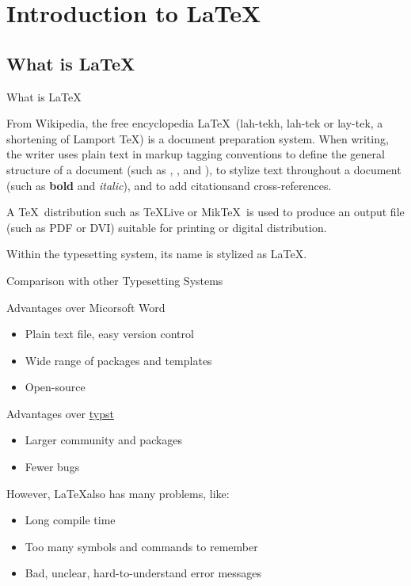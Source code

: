 \section{Introduction to \LaTeX}

\subsection{What is \LaTeX}

\begin{frame}{What is \LaTeX}
    \begin{block}{From Wikipedia, the free encyclopedia\footnotemark[1]}
        \LaTeX\ (lah-tekh, lah-tek or lay-tek, a shortening of Lamport \TeX) is a document preparation system. When writing, the writer uses plain text in markup tagging conventions to define the general structure of a document (such as , , and ), to stylize text throughout a document (such as \textbf{bold} and \textit{italic}), and to add citations\footnotemark[1] and cross-references. \medskip

        A \TeX\ distribution such as \TeX Live or Mik\TeX\ is used to produce an output file (such as PDF or DVI) suitable for printing or digital distribution. \medskip

        Within the typesetting system, its name is stylized as \LaTeX.
    \end{block}


\end{frame}

\begin{frame}{Comparison with other Typesetting Systems}
    \begin{block}{Advantages over Micorsoft Word}
        \begin{itemize}
            \item Plain text file, easy version control
            \item Wide range of packages and templates
            \item Open-source
        \end{itemize}
    \end{block}
    \begin{block}{Advantages over \hyperlink{https://typst.app/}{typst}}
        \begin{itemize}
            \item Larger community and packages
            \item Fewer bugs
        \end{itemize}
    \end{block}
    However, \LaTeX also has many problems, like:
    \begin{itemize}
        \item Long compile time
        \item Too many symbols and commands to remember
        \item Bad, unclear, hard-to-understand error messages
    \end{itemize}
\end{frame}

